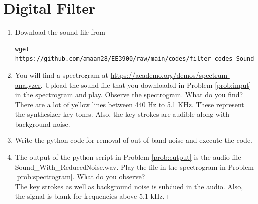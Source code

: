 \documentclass[journal,12pt,twocolumn]{IEEEtran}
\renewcommand\thesection{\arabic{section}}
\begin{document}
\section{Digital Filter}
\begin{enumerate}[label=\thesection.\arabic*
,ref=\thesection.\theenumi]
\item
\label{prob:input}
Download the sound file from  
\begin{lstlisting}
wget https://github.com/amaan28/EE3900/raw/main/codes/filter_codes_Sound_Noise.wav
\end{lstlisting}
\item
\label{prob:spectrogram}
You will find a spectrogram at \href{https://academo.org/demos/spectrum-analyzer}{\url{https://academo.org/demos/spectrum-analyzer}}. 
%
Upload the sound file that you downloaded in Problem \ref{prob:input} in the spectrogram  and play.  Observe the spectrogram. What do you find?
\\
%
\solution There are a lot of yellow lines between 440 Hz to 5.1 KHz.  These represent the synthesizer key tones. Also, the key strokes
are audible along with background noise.
\item
\label{prob:output}
Write the python code for removal of out of band noise and execute the code.
\\
\solution

%
\item
The output of the python script in Problem \ref{prob:output} is the audio file Sound\_With\_ReducedNoise.wav. Play the file in the spectrogram in Problem \ref{prob:spectrogram}. What do you observe?
\\
\solution The key strokes as well as background noise is subdued in the audio.  Also,  the signal is blank for frequencies above 5.1 kHz.+
\end{enumerate}
\newpage
\end{document}
